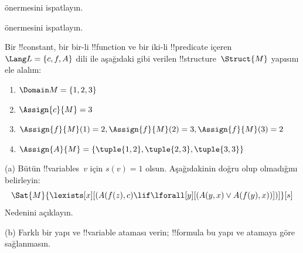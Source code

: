 
\begin{prob}
   önermesini ispatlayın.
\end{prob}
\tagendprob


\begin{prob}
   önermesini ispatlayın.
\end{prob}
\tagendprob

\begin{prob}
Bir !!{constant}, bir bir-li !!{function} ve bir iki-li !!{predicate}
içeren $\Lang L = \{c, f, A\}$ dili ile aşağıdaki gibi verilen
!!{structure}~$\Struct{M}$ yapısını ele alalım:
\begin{enumerate}
\item $\Domain M = \{1, 2, 3\}$
\item $\Assign{c}{M} = 3$
\item $\Assign{f}{M}(1) = 2, \Assign{f}{M}(2) = 3, \Assign{f}{M}(3) = 2$
\item $\Assign{A}{M} = \{\tuple{1, 2}, \tuple{2, 3}, \tuple{3, 3}\}$
\end{enumerate}
(a) Bütün !!{variable}s~$v$ için $s(v) = 1$ olsun. Aşağıdakinin doğru
olup olmadığını belirleyin:
\[
\Sat{M}{\lexists[x][(A(f(z), c) \lif \lforall[y][(A(y, x) \lor A(f(y),
      x))])]}[s]
\]
Nedenini açıklayın.

(b) Farklı bir yapı ve !!{variable} ataması verin; !!{formula} bu yapı
ve atamaya göre sağlanmasın.
\end{prob}


